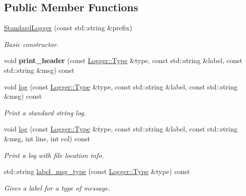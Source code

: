 \subsection*{Public Member Functions}
\begin{DoxyCompactItemize}
\item 
\mbox{\label{class_standard_logger_aa037227d1766af8b649e46849d466d8c}} 
\mbox{\hyperlink{class_standard_logger_aa037227d1766af8b649e46849d466d8c}{Standard\+Logger}} (const std\+::string \&prefix)
\begin{DoxyCompactList}\small\item\em Basic constructor. \end{DoxyCompactList}\item 
\mbox{\label{class_standard_logger_ad116629c2fb7d023442df24f5c0951a1}} 
void {\bfseries print\+\_\+header} (const \mbox{\hyperlink{class_logger_acd39cb578d7a6750c959f2fad38d8db6}{Logger\+::\+Type}} \&type, const std\+::string \&label, const std\+::string \&msg) const
\item 
void \mbox{\hyperlink{class_standard_logger_a11c29fca1b05d7ff331b298e9c91cd81}{log}} (const \mbox{\hyperlink{class_logger_acd39cb578d7a6750c959f2fad38d8db6}{Logger\+::\+Type}} \&type, const std\+::string \&label, const std\+::string \&msg) const
\begin{DoxyCompactList}\small\item\em Print a standard string log. \end{DoxyCompactList}\item 
void \mbox{\hyperlink{class_standard_logger_a4e63f888143cf77d576056b626f8de00}{log}} (const \mbox{\hyperlink{class_logger_acd39cb578d7a6750c959f2fad38d8db6}{Logger\+::\+Type}} \&type, const std\+::string \&label, const std\+::string \&msg, int line, int col) const
\begin{DoxyCompactList}\small\item\em Print a log with file location info. \end{DoxyCompactList}\item 
std\+::string \mbox{\hyperlink{class_standard_logger_a5803969715008363869dfd47326790bb}{label\+\_\+msg\+\_\+type}} (const \mbox{\hyperlink{class_logger_acd39cb578d7a6750c959f2fad38d8db6}{Logger\+::\+Type}} \&type) const
\begin{DoxyCompactList}\small\item\em Gives a label for a type of message. \end{DoxyCompactList}\item 

\end{DoxyCompactItemize}
